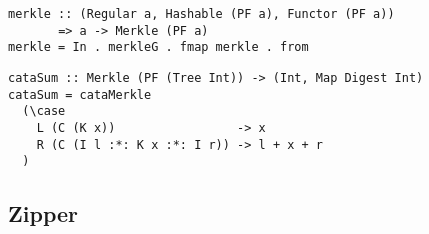 \begin{verbatim}
merkle :: (Regular a, Hashable (PF a), Functor (PF a))
       => a -> Merkle (PF a)
merkle = In . merkleG . fmap merkle . from
\end{verbatim}

\begin{verbatim}
cataSum :: Merkle (PF (Tree Int)) -> (Int, Map Digest Int)
cataSum = cataMerkle
  (\case
    L (C (K x))                 -> x
    R (C (I l :*: K x :*: I r)) -> l + x + r
  )
\end{verbatim}

\subsection{Zipper}